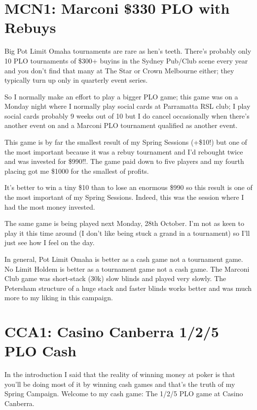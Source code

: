 \section*{MCN1: Marconi \$330 PLO with Rebuys}

Big Pot Limit Omaha tournaments are rare as hen's teeth. There's
probably only 10 PLO tournaments of \$300+ buyins in the Sydney
Pub/Club scene every year and you don't find that many at The Star or
Crown Melbourne either; they typically turn up only in quarterly event
series.

So I normally make an effort to play a bigger PLO game; this game was
on a Monday night where I normally play social cards at Parramatta RSL
club; I play social cards probably 9 weeks out of 10 but I do cancel
occasionally when there's another event on and a Marconi PLO
tournament qualified as another event.

This game is by far the smallest result of my Spring Sessions (+\$10!)
but one of the most important because it was a rebuy tournament and
I'd rebought twice and was invested for \$990!!. The game paid down to
five players and my fourth placing got me \$1000 for the smallest of
profits.

It's better to win a tiny \$10 than to lose an enormous \$990 so this
result is one of the most important of my Spring Sessions. Indeed,
this was the session where I had the most money invested.

The same game is being played next Monday, 28th October. I'm not as
keen to play it this time around (I don't like being stuck a grand in
a tournament) so I'll just see how I feel on the day.

In general, Pot Limit Omaha is better as a cash game not a tournament
game. No Limit Holdem is better as a tournament game not a cash game.
The Marconi Club game was short-stack (30k) slow blinds and played
very slowly. The Petersham structure of a huge stack and faster blinds
works better and was much more to my liking in this campaign.

\section*{CCA1: Casino Canberra 1/2/5 PLO Cash}

In the introduction I said that the reality of winning money at poker
is that you'll be doing most of it by winning cash games and that's
the truth of my Spring Campaign. Welcome to my cash game: The 1/2/5
PLO game at Casino Canberra.

